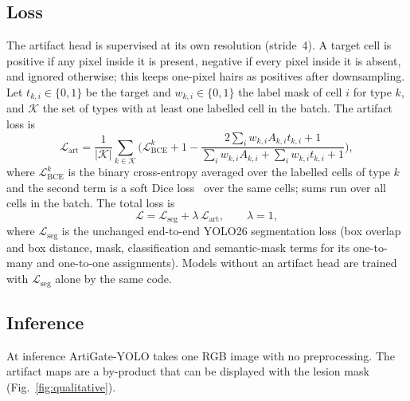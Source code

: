 \subsection{Loss}\label{sec:loss}
The artifact head is supervised at its own resolution (stride~4). A target cell is positive if any pixel inside it is present, negative if every pixel inside it is absent, and ignored otherwise; this keeps one-pixel hairs as positives after downsampling. Let $t_{k,i}\in\{0,1\}$ be the target and $w_{k,i}\in\{0,1\}$ the label mask of cell $i$ for type $k$, and $\mathcal{K}$ the set of types with at least one labelled cell in the batch. The artifact loss is
\begin{equation}
\mathcal{L}_{\mathrm{art}}=\frac{1}{|\mathcal{K}|}\sum_{k\in\mathcal{K}}\Big(\mathcal{L}^{k}_{\mathrm{BCE}}+1-\frac{2\sum_i w_{k,i}A_{k,i}t_{k,i}+1}{\sum_i w_{k,i}A_{k,i}+\sum_i w_{k,i}t_{k,i}+1}\Big),
\label{eq:artloss}
\end{equation}
where $\mathcal{L}^{k}_{\mathrm{BCE}}$ is the binary cross-entropy averaged over the labelled cells of type $k$ and the second term is a soft Dice loss~\cite{milletari2016vnet} over the same cells; sums run over all cells in the batch. The total loss is
\begin{equation}
\mathcal{L}=\mathcal{L}_{\mathrm{seg}}+\lambda\,\mathcal{L}_{\mathrm{art}},\qquad\lambda=1,
\label{eq:total}
\end{equation}
where $\mathcal{L}_{\mathrm{seg}}$ is the unchanged end-to-end YOLO26 segmentation loss (box overlap and box distance, mask, classification and semantic-mask terms for its one-to-many and one-to-one assignments). Models without an artifact head are trained with $\mathcal{L}_{\mathrm{seg}}$ alone by the same code.

\subsection{Inference}
At inference ArtiGate-YOLO takes one RGB image with no preprocessing. The artifact maps are a by-product that can be displayed with the lesion mask (Fig.~\ref{fig:qualitative}).
